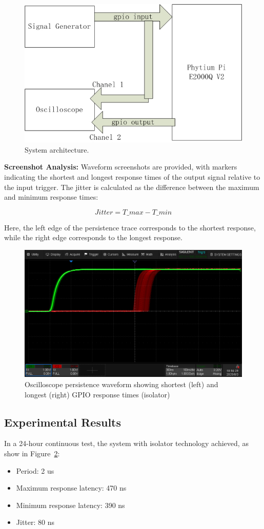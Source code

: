 \documentclass[letterpaper]{article}
\begin{document}
\begin{figure}
    \centering
    \includegraphics[width=0.85\columnwidth]{evaluation.jpg}
    \caption{System architecture.}
    \label{fig:oscilloscope}
\end{figure}


\textbf{Screenshot Analysis:}  
Waveform screenshots are provided, with markers indicating the shortest and longest response times of the output signal relative to the input trigger. The jitter is calculated as the difference between the maximum and minimum response times:  

\[
Jitter = T\_{max} - T\_{min}
\]


Here, the left edge of the persistence trace corresponds to the shortest response, while the right edge corresponds to the longest response.  

\begin{figure}[h]
  \centering
  \includegraphics[width=0.8\linewidth]{figures/islintgpio.png}
  \caption{Oscilloscope persistence waveform showing shortest (left) and longest (right) GPIO response times (isolator)}
  \label{fig:islintgpio}
\end{figure}

\subsection{Experimental Results}
In a 24-hour continuous test, the system with isolator technology achieved, as show in Figure~\ref{fig:islintgpio}:
\begin{itemize}
    \item Period: 2 us
    \item Maximum response latency: 470 ns
    \item Minimum response latency: 390 ns
    \item Jitter: 80 ns
\end{itemize}
\end{document}
